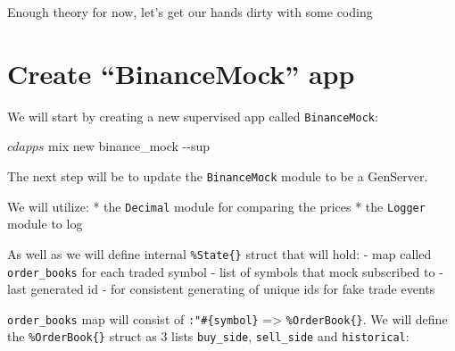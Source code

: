\documentclass[
]{book}
\newenvironment{Shaded}{\begin{snugshade}}{\end{snugshade}}
\newcommand{\AttributeTok}[1]{\textcolor[rgb]{0.77,0.63,0.00}{#1}}
\newcommand{\ExtensionTok}[1]{#1}
\newcommand{\NormalTok}[1]{#1}
\begin{document}
Enough theory for now, let's get our hands dirty with some coding

\hypertarget{create-binancemock-app}{%
\section{Create ``BinanceMock'' app}\label{create-binancemock-app}}

We will start by creating a new supervised app called \texttt{BinanceMock}:

\begin{Shaded}
\begin{Highlighting}[]
\ExtensionTok{$}\NormalTok{ cd apps}
\ExtensionTok{$}\NormalTok{ mix new binance\_mock }\AttributeTok{{-}{-}sup}
\end{Highlighting}
\end{Shaded}

The next step will be to update the \texttt{BinanceMock} module to be a GenServer.

We will utilize:
* the \texttt{Decimal} module for comparing the prices
* the \texttt{Logger} module to log

As well as we will define internal \texttt{\%State\{\}} struct that will hold:
- map called \texttt{order\_books} for each traded symbol
- list of symbols that mock subscribed to
- last generated id - for consistent generating of unique ids for fake trade events

\texttt{order\_books} map will consist of \texttt{:"\#\{symbol\}} =\textgreater{} \texttt{\%OrderBook\{\}}. We will define the \texttt{\%OrderBook\{\}} struct as 3 lists \texttt{buy\_side}, \texttt{sell\_side} and \texttt{historical}:
\end{document}
